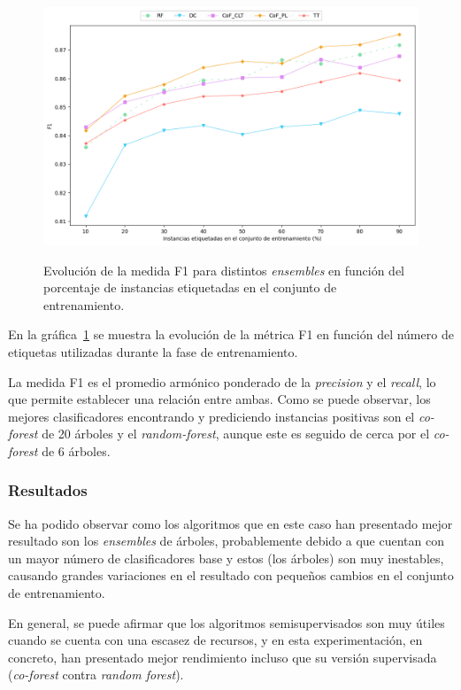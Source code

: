 \begin{figure}[h]
	\caption[\textit{Phishing}: comparativa SL contra SSL (F1~\textit{score})]{Evolución de la medida F1 para distintos \textit{ensembles} en función del porcentaje de instancias etiquetadas en el conjunto de entrenamiento.}
	\centering
	\includegraphics[scale=0.45]{../img/memoria/5_phishing/f1f19_evolution_f1}
	\label{gr:ph-f1f19_sl-ssl-f1}
\end{figure}

En la gráfica~\ref{gr:ph-f1f19_sl-ssl-f1} se muestra la evolución de la métrica F1 en función del número de etiquetas utilizadas durante la fase de entrenamiento. 

La medida F1 es el promedio armónico ponderado de la \textit{precision} y el \textit{recall}, lo que permite establecer una relación entre ambas. Como se puede observar, los mejores clasificadores encontrando y prediciendo instancias positivas son el \textit{co-forest} de 20 árboles y el \textit{random-forest}, aunque este es seguido de cerca por el \textit{co-forest} de 6 árboles.

\subsubsection{Resultados}

Se ha podido observar como los algoritmos que en este caso han presentado mejor resultado son los \textit{ensembles} de árboles, probablemente debido a que cuentan con un mayor número de clasificadores base y estos (los árboles) son muy inestables, causando grandes variaciones en el resultado con pequeños cambios en el conjunto de entrenamiento.

En general, se puede afirmar que los algoritmos semisupervisados son muy útiles cuando se cuenta con una escasez de recursos, y en esta experimentación, en concreto, han presentado mejor rendimiento incluso que su versión supervisada (\textit{co-forest} contra \textit{random forest}).

